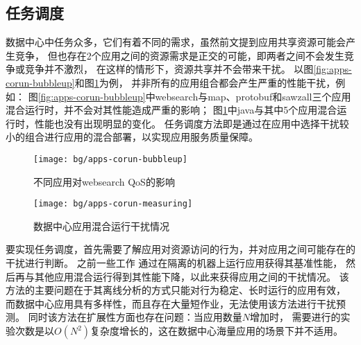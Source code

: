 \subsection{任务调度}

数据中心中任务众多，它们有着不同的需求，虽然前文提到应用共享资源可能会产生竞争，
但也存在2个应用之间的资源需求是正交的可能，即两者之间不会发生竞争或竞争并不激烈，
在这样的情形下，资源共享并不会带来干扰。
以图\ref{fig:apps-corun-bubbleup}和图\ref{fig:apps-corun-measuring}为例，
并非所有的应用组合都会产生严重的性能干扰，例如：
图\ref{fig:apps-corun-bubbleup}中websearch与map、protobuf和sawzall三个应用混合运行时，并不会对其性能造成严重的影响；
图\ref{fig:apps-corun-measuring}中java与其中5个应用混合运行时，性能也没有出现明显的变化。
任务调度方法即是通过在应用中选择干扰较小的组合进行应用的混合部署，以实现应用服务质量保障。

\begin{figure}[tb]
\begin{minipage}[b]{0.48\textwidth}
  \centering
  \texttt{[image: bg/apps-corun-bubbleup]}
  \caption[不同应用对websearch QoS的影响]{不同应用对websearch QoS的影响\cite{mars_bubble-up:_2011}}
  \label{fig:apps-corun-bubbleup}
\end{minipage}\hfill
\begin{minipage}[b]{0.48\textwidth}
  \centering
  \texttt{[image: bg/apps-corun-measuring]}
  \caption[数据中心应用混合运行干扰情况]{数据中心应用混合运行干扰情况\cite{kambadur_measuring_2012}}
  \label{fig:apps-corun-measuring}
\end{minipage}
\end{figure}

要实现任务调度，首先需要了解应用对资源访问的行为，并对应用之间可能存在的干扰进行判断。
之前一些工作\cite{Blagodurov:2010, Chiang:2011, herdrich_rate-based_2009, Jiang:2008,
Kim:2004, mars_contention_2010, Nathuji:2010, Tang:2011}
通过在隔离的机器上运行应用获得其基准性能，
然后再与其他应用混合运行得到其性能下降，以此来获得应用之间的干扰情况。
该方法的主要问题在于其离线分析的方式只能对行为稳定、长时运行的应用有效，
而数据中心应用具有多样性，而且存在大量短作业，无法使用该方法进行干扰预测。
同时该方法在扩展性方面也存在问题：当应用数量$N$增加时，
需要进行的实验次数是以$O(N^2)$复杂度增长的，这在数据中心海量应用的场景下并不适用。

